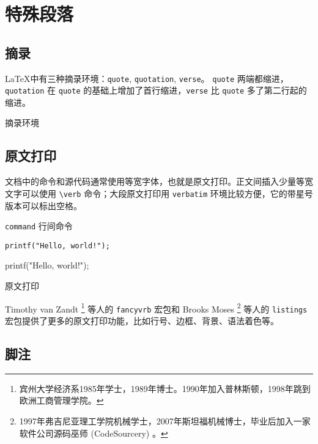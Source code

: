 \section{特殊段落}
\subsection{摘录}

\LaTeX 中有三种摘录环境：\texttt{quote}, \texttt{quotation}, \texttt{verse}。 \texttt{quote} 两端都缩进， \texttt{quotation} 在 \texttt{quote} 的基础上增加了首行缩进，\texttt{verse} 比 \texttt{quote} 多了第二行起的缩进。

\begin{example}[h]
\caption{摘录环境}
\end{example}

\subsection{原文打印}
文档中的命令和源代码通常使用等宽字体，也就是原文打印。正文间插入少量等宽文字可以使用 \verb|\verb| 命令；大段原文打印用 \texttt{verbatim} 环境比较方便，它的带星号版本可以标出空格。

\begin{example}[h]
\begin{RLDemo}[numbers=left]
\verb|command| 行间命令
\begin{verbatim}
printf("Hello, world!");
\end{verbatim}
\begin{verbatim*}
printf("Hello, world!");
\end{verbatim*}
\end{RLDemo}
\caption{原文打印}
\end{example}

Timothy van Zandt\indexVanZandt{} \footnote{宾州大学经济系1985年学士，1989年博士。1990年加入普林斯顿，1998年跳到欧洲工商管理学院。} 等人的 \texttt{fancyvrb} 宏包\citep{Zandt_fancyvrb}和 Brooks Moses\indexMoses{} \footnote{1997年弗吉尼亚理工学院机械学士，2007年斯坦福机械博士，毕业后加入一家软件公司源码巫师 (CodeSourcery) 。} 等人的 \texttt{listings} 宏包\citep{Moses_listings}提供了更多的原文打印功能，比如行号、边框、背景、语法着色等。

\subsection{脚注}

